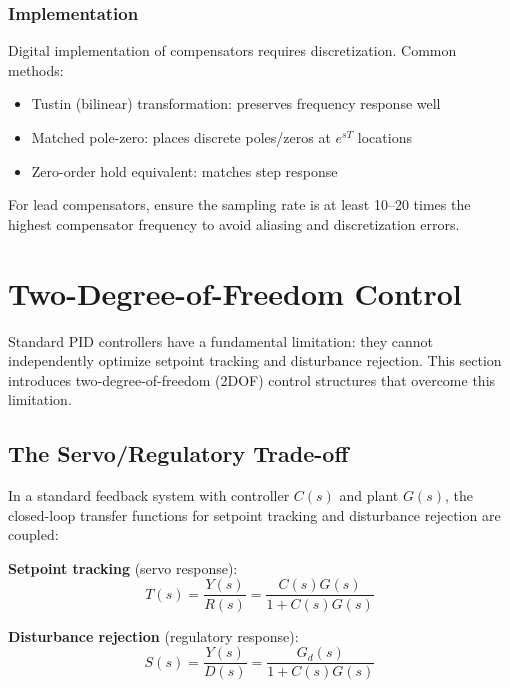 \subsubsection{Implementation}

Digital implementation of compensators requires discretization. Common methods:
\begin{itemize}
    \item Tustin (bilinear) transformation: preserves frequency response well
    \item Matched pole-zero: places discrete poles/zeros at $e^{sT}$ locations
    \item Zero-order hold equivalent: matches step response
\end{itemize}

For lead compensators, ensure the sampling rate is at least 10--20 times the highest compensator frequency to avoid aliasing and discretization errors.

\section{Two-Degree-of-Freedom Control}
\label{sec:2dof_control}

Standard PID controllers have a fundamental limitation: they cannot independently optimize setpoint tracking and disturbance rejection. This section introduces two-degree-of-freedom (2DOF) control structures that overcome this limitation.

\subsection{The Servo/Regulatory Trade-off}
\label{subsec:servo_regulatory}

In a standard feedback system with controller $C(s)$ and plant $G(s)$, the closed-loop transfer functions for setpoint tracking and disturbance rejection are coupled:

\textbf{Setpoint tracking} (servo response):
\begin{equation}
T(s) = \frac{Y(s)}{R(s)} = \frac{C(s)G(s)}{1 + C(s)G(s)}
\end{equation}

\textbf{Disturbance rejection} (regulatory response):
\begin{equation}
S(s) = \frac{Y(s)}{D(s)} = \frac{G_d(s)}{1 + C(s)G(s)}
\end{equation}

